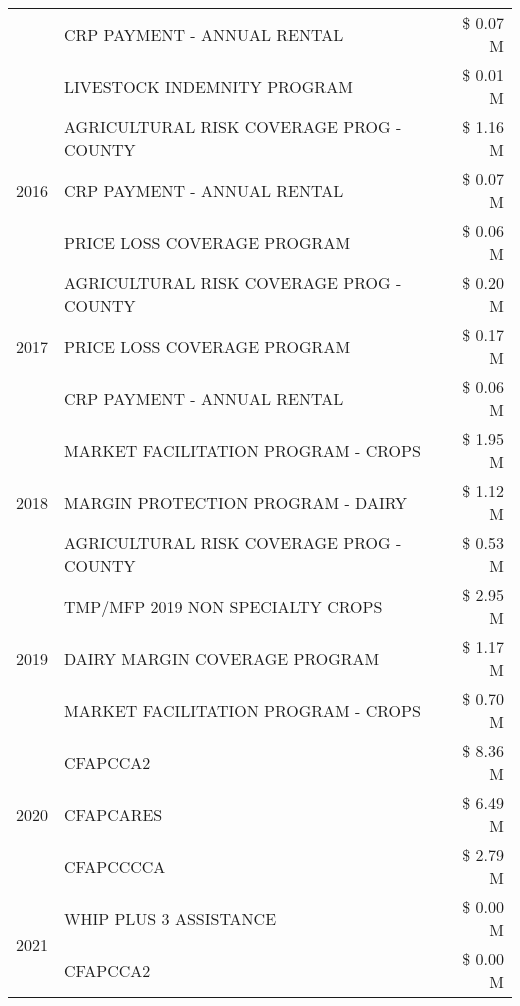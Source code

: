 \begin{tabular}{llr}
 & CRP PAYMENT - ANNUAL RENTAL & \$ 0.07 M \\
 & LIVESTOCK INDEMNITY PROGRAM & \$ 0.01 M \\
\cline{1-3}
\multirow[t]{3}{*}{2016} & AGRICULTURAL RISK COVERAGE PROG - COUNTY & \$ 1.16 M \\
 & CRP PAYMENT - ANNUAL RENTAL & \$ 0.07 M \\
 & PRICE LOSS COVERAGE PROGRAM & \$ 0.06 M \\
\cline{1-3}
\multirow[t]{3}{*}{2017} & AGRICULTURAL RISK COVERAGE PROG - COUNTY & \$ 0.20 M \\
 & PRICE LOSS COVERAGE PROGRAM & \$ 0.17 M \\
 & CRP PAYMENT - ANNUAL RENTAL & \$ 0.06 M \\
\cline{1-3}
\multirow[t]{3}{*}{2018} & MARKET FACILITATION PROGRAM - CROPS & \$ 1.95 M \\
 & MARGIN PROTECTION PROGRAM - DAIRY & \$ 1.12 M \\
 & AGRICULTURAL RISK COVERAGE PROG - COUNTY & \$ 0.53 M \\
\cline{1-3}
\multirow[t]{3}{*}{2019} & TMP/MFP 2019 NON SPECIALTY CROPS & \$ 2.95 M \\
 & DAIRY MARGIN COVERAGE PROGRAM & \$ 1.17 M \\
 & MARKET FACILITATION PROGRAM - CROPS & \$ 0.70 M \\
\cline{1-3}
\multirow[t]{3}{*}{2020} & CFAPCCA2 & \$ 8.36 M \\
 & CFAPCARES & \$ 6.49 M \\
 & CFAPCCCCA & \$ 2.79 M \\
\cline{1-3}
\multirow[t]{2}{*}{2021} & WHIP PLUS 3 ASSISTANCE & \$ 0.00 M \\
 & CFAPCCA2 & \$ 0.00 M \\
\cline{1-3}
\bottomrule
\end{tabular}
